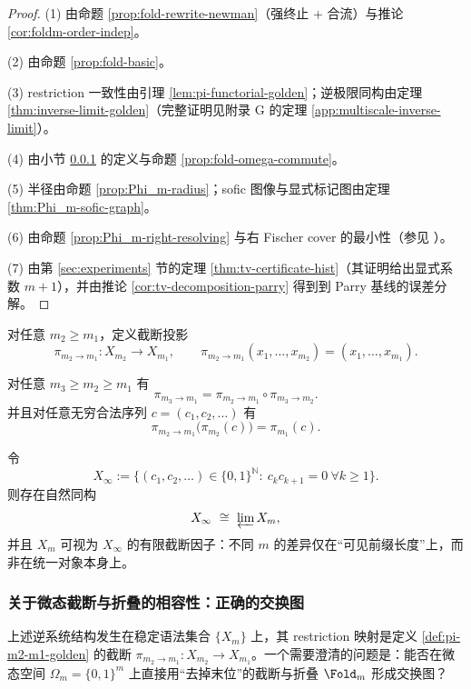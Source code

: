 \begin{proof}
(1) 由命题 \ref{prop:fold-rewrite-newman}（强终止 + 合流）与推论 \ref{cor:foldm-order-indep}。

(2) 由命题 \ref{prop:fold-basic}。

(3) restriction 一致性由引理 \ref{lem:pi-functorial-golden}；逆极限同构由定理 \ref{thm:inverse-limit-golden}（完整证明见附录 G 的定理 \ref{app:multiscale-inverse-limit}）。

(4) 由小节 \ref{subsec:fold-omega-restriction} 的定义与命题 \ref{prop:fold-omega-commute}。

(5) 半径由命题 \ref{prop:Phi_m-radius}；sofic 图像与显式标记图由定理 \ref{thm:Phi_m-sofic-graph}。

(6) 由命题 \ref{prop:Phi_m-right-resolving} 与右 Fischer cover 的最小性（参见 \cite{LindMarcus1995,Kitchens1998SymbolicDynamics}）。

(7) 由第 \ref{sec:experiments} 节的定理 \ref{thm:tv-certificate-hist}（其证明给出显式系数 $m+1$），并由推论 \ref{cor:tv-decomposition-parry} 得到到 Parry 基线的误差分解。
\end{proof}

\begin{definition}\label{def:pi-m2-m1-golden}
对任意 $m_2\ge m_1$，定义截断投影
\[
\pi_{m_2\to m_1}:X_{m_2}\to X_{m_1},\qquad
\pi_{m_2\to m_1}(x_1,\dots,x_{m_2})=(x_1,\dots,x_{m_1}).
\]
\end{definition}

\begin{lemma}[一致性]\label{lem:pi-functorial-golden}
对任意 $m_3\ge m_2\ge m_1$ 有
\[
\pi_{m_3\to m_1}=\pi_{m_2\to m_1}\circ \pi_{m_3\to m_2}.
\]
并且对任意无穷合法序列 $c=(c_1,c_2,\dots)$ 有
\[
\pi_{m_2\to m_1}\bigl(\pi_{m_2}(c)\bigr)=\pi_{m_1}(c).
\]
\end{lemma}

\begin{theorem}\label{thm:inverse-limit-golden}
令
\[
X_\infty:=\{(c_1,c_2,\dots)\in\{0,1\}^{\mathbb{N}}:\ c_kc_{k+1}=0\ \forall k\ge 1\}.
\]
则存在自然同构
\[
X_\infty\ \cong\ \varprojlim X_m,
\]
并且 $X_m$ 可视为 $X_\infty$ 的有限截断因子：不同 $m$ 的差异仅在“可见前缀长度”上，而非在统一对象本身上。
\end{theorem}

\subsubsection{关于微态截断与折叠的相容性：正确的交换图}\label{subsec:fold-omega-restriction}
上述逆系统结构发生在稳定语法集合 $\{X_m\}$ 上，其 restriction 映射是定义 \ref{def:pi-m2-m1-golden} 的截断 $\pi_{m_2\to m_1}:X_{m_2}\to X_{m_1}$。一个需要澄清的问题是：能否在微态空间 $\Omega_m=\{0,1\}^m$ 上直接用“去掉末位”的截断与折叠 $\Fold_m$ 形成交换图？

